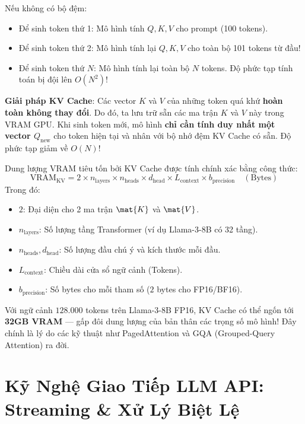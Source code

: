 \begin{workedexamplebox}
Nếu không có bộ đệm:
\begin{itemize}
  \item Để sinh token thứ 1: Mô hình tính $Q, K, V$ cho prompt (100 tokens).
  \item Để sinh token thứ 2: Mô hình tính lại $Q, K, V$ cho toàn bộ 101 tokens từ đầu!
  \item Để sinh token thứ $N$: Mô hình tính lại toàn bộ $N$ tokens. Độ phức tạp tính toán bị đội lên $O(N^2)$!
\end{itemize}
\textbf{Giải pháp KV Cache}: Các vector $K$ và $V$ của những token quá khứ \textbf{hoàn toàn không thay đổi}. Do đó, ta lưu trữ sẵn các ma trận $K$ và $V$ này trong VRAM GPU. Khi sinh token mới, mô hình \textbf{chỉ cần tính duy nhất một vector $Q_{\text{new}}$} cho token hiện tại và nhân với bộ nhớ đệm KV Cache có sẵn. Độ phức tạp giảm về $O(N)$!
\end{workedexamplebox}

\begin{definitionbox}
Dung lượng VRAM tiêu tốn bởi KV Cache được tính chính xác bằng công thức:
\[
\text{VRAM}_{\text{KV}} = 2 \times n_{\text{layers}} \times n_{\text{heads}} \times d_{\text{head}} \times L_{\text{context}} \times b_{\text{precision}} \quad (\text{Bytes})
\]
Trong đó:
\begin{itemize}
  \item $2$: Đại diện cho 2 ma trận $\mat{K}$ và $\mat{V}$.
  \item $n_{\text{layers}}$: Số lượng tầng Transformer (ví dụ Llama-3-8B có 32 tầng).
  \item $n_{\text{heads}}, d_{\text{head}}$: Số lượng đầu chú ý và kích thước mỗi đầu.
  \item $L_{\text{context}}$: Chiều dài cửa sổ ngữ cảnh (Tokens).
  \item $b_{\text{precision}}$: Số bytes cho mỗi tham số ($2$ bytes cho FP16/BF16).
\end{itemize}
Với ngữ cảnh $128.000$ tokens trên Llama-3-8B FP16, KV Cache có thể ngốn tới \textbf{32GB VRAM} — gấp đôi dung lượng của bản thân các trọng số mô hình! Đây chính là lý do các kỹ thuật như PagedAttention và GQA (Grouped-Query Attention) ra đời.
\end{definitionbox}

\section{Kỹ Nghệ Giao Tiếp LLM API: Streaming \& Xử Lý Biệt Lệ}
\label{sec:llm-api-engineering}

